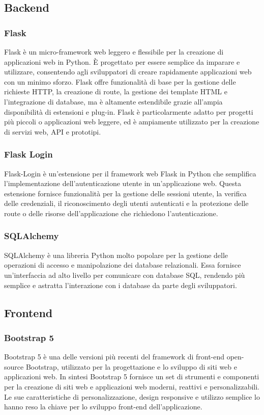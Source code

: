 \documentclass{article}
\begin{document}
\subsection{Backend}
\subsubsection{Flask}
Flask è un micro-framework web leggero e flessibile per la creazione di applicazioni web in Python. È progettato per essere semplice da imparare e utilizzare, consentendo agli sviluppatori di creare rapidamente applicazioni web con un minimo sforzo. Flask offre funzionalità di base per la gestione delle richieste HTTP, la creazione di route, la gestione dei template HTML e l'integrazione di database, ma è altamente estendibile grazie all'ampia disponibilità di estensioni e plug-in. Flask è particolarmente adatto per progetti più piccoli o applicazioni web leggere, ed è ampiamente utilizzato per la creazione di servizi web, API e prototipi.
\subsubsection{Flask Login}
Flask-Login è un'estensione per il framework web Flask in Python che semplifica l'implementazione dell'autenticazione utente in un'applicazione web. Questa estensione fornisce funzionalità per la gestione delle sessioni utente, la verifica delle credenziali, il riconoscimento degli utenti autenticati e la protezione delle route o delle risorse dell'applicazione che richiedono l'autenticazione.
\subsubsection{SQLAlchemy}
SQLAlchemy è una libreria Python molto popolare per la gestione delle operazioni di accesso e manipolazione dei database relazionali. Essa fornisce un'interfaccia ad alto livello per comunicare con database SQL, rendendo più semplice e astratta l'interazione con i database da parte degli sviluppatori.

\subsection{Frontend}
\subsubsection{Bootstrap 5}
Bootstrap 5 è una delle versioni più recenti del framework di front-end open-source Bootstrap, utilizzato per la progettazione e lo sviluppo di siti web e applicazioni web. In sintesi Bootstrap 5 fornisce un set di strumenti e componenti per la creazione di siti web e applicazioni web moderni, reattivi e personalizzabili. Le sue caratteristiche di personalizzazione, design responsive e utilizzo semplice lo hanno reso la chiave per lo sviluppo front-end dell'applicazione.
\end{document}
